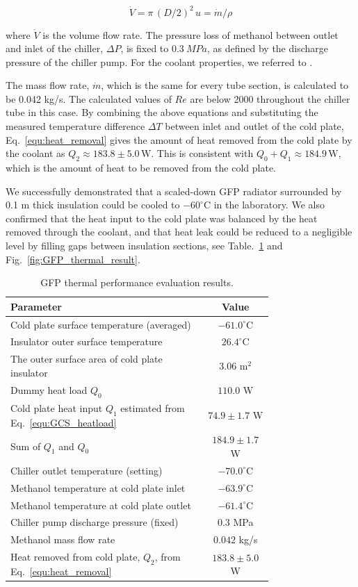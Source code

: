 \begin{equation}\label{equ:volume_flow_rate}
\dot{V} = \pi \, (D/2)^2 \, u = \dot{m}/\rho
\end{equation}

where $\dot{V}$ is the volume flow rate. The pressure loss of methanol between outlet and inlet of the chiller, $\Delta P$, is fixed to $0.3~MPa$, as defined by the discharge pressure of the chiller pump. For the coolant properties, we referred to \cite{Lemmon2013NISTSR}.

The mass flow rate, $\dot{m}$, which is the same for every tube section, is calculated to be 0.042 kg/s. The calculated values of $Re$ are below 2000 throughout the chiller tube in this case. By combining the above equations and substituting the measured temperature difference $\Delta T$ between inlet and outlet of the cold plate, Eq.~\ref{equ:heat_removal} gives the amount of heat removed from the cold plate by the coolant as $Q_2 \approx 183.8 \pm 5.0 \, \text{W}$. This is consistent with $Q_0 + Q_1 \approx 184.9 \, \text{W}$, which is the amount of heat to be removed from the cold plate.

We successfully demonstrated that a scaled-down \ac{GFP} radiator surrounded by 0.1 m thick insulation could be cooled to $-60^\circ \text{C}$ in the laboratory. We also confirmed that the heat input to the cold plate was balanced by the heat removed through the coolant, and that heat leak could be reduced to a negligible level by filling gaps between insulation sections, see Table.~\ref{tab:GFP_thermal_result} and Fig.~\ref{fig:GFP_thermal_result}.

\begin{table}
\small
\centering
\begin{tabular}{p{0.75\linewidth}c}
\toprule
\textbf{Parameter} & \textbf{Value} \\
\midrule
Cold plate surface temperature (averaged) & $-61.0^\circ$C \\
Insulator outer surface temperature & $26.4^\circ$C \\
The outer surface area of cold plate insulator & $3.06$ m$^2$ \\
Dummy heat load $Q_0$ & $110.0$ W \\
Cold plate heat input $Q_1$ estimated from Eq.~\ref{equ:GCS_heatload} & $74.9 \pm 1.7$ W \\
Sum of $Q_1$ and $Q_0$ & $184.9 \pm 1.7$ W \\
\midrule
Chiller outlet temperature (setting) & $-70.0^\circ$C \\
Methanol temperature at cold plate inlet & $-63.9^\circ$C \\
Methanol temperature at cold plate outlet & $-61.4^\circ$C \\
Chiller pump discharge pressure (fixed) & $0.3$ MPa \\
Methanol mass flow rate & $0.042$ kg/s \\
Heat removed from cold plate, $Q_2$, from Eq.~\ref{equ:heat_removal} & $183.8 \pm 5.0$ W \\
\bottomrule
\end{tabular}
\caption{\ac{GFP} thermal performance evaluation results.}
\label{tab:GFP_thermal_result}
\end{table}

